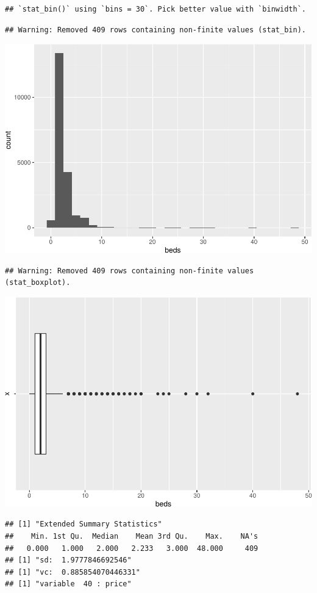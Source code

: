 \begin{verbatim}
## `stat_bin()` using `bins = 30`. Pick better value with `binwidth`.
\end{verbatim}

\begin{verbatim}
## Warning: Removed 409 rows containing non-finite values (stat_bin).
\end{verbatim}

\includegraphics{anal_files/figure-latex/unnamed-chunk-9-20.pdf}

\begin{verbatim}
## Warning: Removed 409 rows containing non-finite values (stat_boxplot).
\end{verbatim}

\includegraphics{anal_files/figure-latex/unnamed-chunk-9-21.pdf}

\begin{verbatim}
## [1] "Extended Summary Statistics"
##    Min. 1st Qu.  Median    Mean 3rd Qu.    Max.    NA's 
##   0.000   1.000   2.000   2.233   3.000  48.000     409 
## [1] "sd:  1.9777846692546"
## [1] "vc:  0.885854070446331"
## [1] "variable  40 : price"
\end{verbatim}

